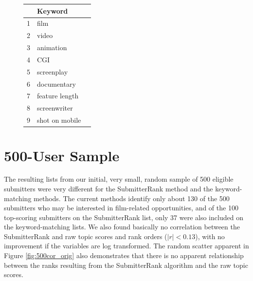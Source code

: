 \documentclass[12pt]{report}   %
\begin{document}
\begin{figure}[h]
\centering
\begin{minipage}{0.45\textwidth}
\captionsetup{font=scriptsize}
\centering
{}
\label{table:filmkeys}
\begin{tabular}{rlr}
  \hline
 & Keyword \\ 
  \hline
1 & film \\ 
  2 & video \\ 
  3 & animation \\ 
  4 & CGI\\ 
  5 & screenplay \\ 
  6 & documentary \\ 
  7 & feature length \\ 
  8 & screenwriter \\ 
  9 & shot on mobile\\ 
   \hline
\end{tabular}
\end{minipage}
\end{figure}

\section{500-User Sample}

The resulting lists from our initial, very small, random sample of 500 eligible submitters were very different for the SubmitterRank method and the keyword-matching methods. The current methods identify only about 130 of the 500 submitters who may be interested in film-related opportunities, and of the 100 top-scoring submitters on the SubmitterRank list, only 37 were also included on the keyword-matching lists. We also found basically no correlation between the SubmitterRank and raw topic scores and rank orders ($|r|<0.13$), with no improvement if the variables are log transformed. The random scatter apparent in Figure \ref{fig:500cor_orig} also demonstrates that there is no apparent relationship between the ranks resulting from the SubmitterRank algorithm and the raw topic scores.
\end{document}
